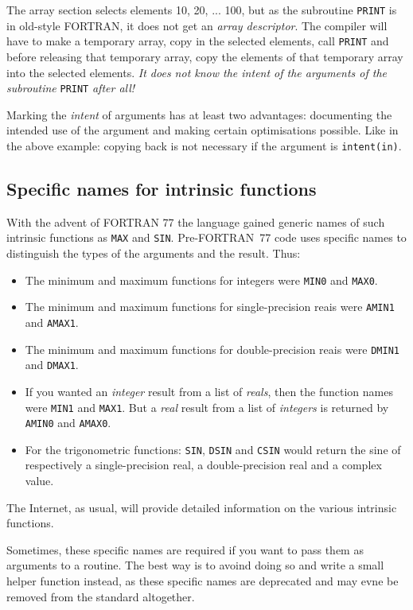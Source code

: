 The array section selects elements 10, 20, ... 100, but as the subroutine \verb+PRINT+
is in old-style FORTRAN, it does not get an \emph{array descriptor}. The compiler
will have to make a temporary array, copy in the selected elements, call \verb+PRINT+
and before releasing that temporary array, copy the elements of that temporary
array into the selected elements. \emph{It does not know the intent of the arguments
of the subroutine} \verb+PRINT+ \emph{after all!}

Marking the \emph{intent} of arguments has at least two advantages:
documenting the intended use of the argument and making certain optimisations
possible. Like in the above example: copying back is not necessary if the argument
is \verb+intent(in)+.


\subsection{Specific names for intrinsic functions}
With the advent of FORTRAN 77 the language gained generic names of such intrinsic
functions as \verb+MAX+ and \verb+SIN+. Pre-FORTRAN~77 code uses specific names
to distinguish the types of the arguments and the result. Thus:
\begin{itemize}
\item
The minimum and maximum functions for integers were \verb+MIN0+ and \verb+MAX0+.
\item
The minimum and maximum functions for single-precision reais were \verb+AMIN1+ and \verb+AMAX1+.
\item
The minimum and maximum functions for double-precision reais were \verb+DMIN1+ and \verb+DMAX1+.
\item
If you wanted an \emph{integer} result from a list of \emph{reals}, then the function names
were \verb+MIN1+ and \verb+MAX1+. But a \emph{real} result from a list of \emph{integers}
is returned by \verb+AMIN0+ and \verb+AMAX0+.
\item
For the trigonometric functions: \verb+SIN+, \verb+DSIN+ and \verb+CSIN+ would return
the sine of respectively a single-precision real, a double-precision real and a complex value.
\end{itemize}

The Internet, as usual, will provide detailed information on the various intrinsic functions.

Sometimes, these specific names are required if you want to pass them as arguments to a
routine. The best way is to avoind doing so and write a small helper function instead,
as these specific names are deprecated and may evne be removed from the standard altogether.


